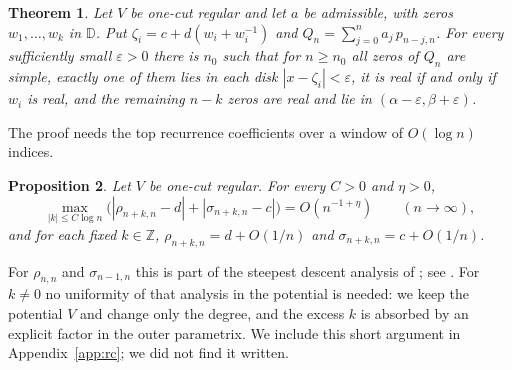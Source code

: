 \documentclass[11pt]{amsart}
\newtheorem{theorem}{Theorem}[section]
\newtheorem{proposition}[theorem]{Proposition}
\theoremstyle{definition}
\theoremstyle{remark}
\numberwithin{equation}{section}
\newcommand{\Z}{\mathbb{Z}}
\newcommand{\D}{\mathbb{D}}
\newcommand{\eps}{\varepsilon}
\begin{document}
\begin{theorem}\label{thm:varying}
Let $V$ be one-cut regular and let $a$ be admissible, with zeros $w_1,\dots,w_k$ in $\D$. Put $\zeta_i=c+d(w_i+w_i^{-1})$ and $Q_n=\sum_{j=0}^{n}a_j\,p_{n-j,n}$. For every sufficiently small $\eps>0$ there is $n_0$ such that for $n\ge n_0$ all zeros of $Q_n$ are simple, exactly one of them lies in each disk $|x-\zeta_i|<\eps$, it is real if and only if $w_i$ is real, and the remaining $n-k$ zeros are real and lie in $(\alpha-\eps,\beta+\eps)$.
\end{theorem}

The proof needs the top recurrence coefficients over a window of $O(\log n)$ indices.

\begin{proposition}\label{prop:RC}
Let $V$ be one-cut regular. For every $C>0$ and $\eta>0$,
\[
\max_{|k|\le C\log n}\bigl(|\rho_{n+k,n}-d|+|\sigma_{n+k,n}-c|\bigr)=O(n^{-1+\eta})\qquad(n\to\infty),
\]
and for each fixed $k\in\Z$, $\rho_{n+k,n}=d+O(1/n)$ and $\sigma_{n+k,n}=c+O(1/n)$.
\end{proposition}

For $\rho_{n,n}$ and $\sigma_{n-1,n}$ this is part of the steepest descent analysis of \cite{DKMVZ}; see \cite[(12.16)]{Bl}. For $k\ne0$ no uniformity of that analysis in the potential is needed: we keep the potential $V$ and change only the degree, and the excess $k$ is absorbed by an explicit factor in the outer parametrix. We include this short argument in Appendix~\ref{app:rc}; we did not find it written.
\end{document}
